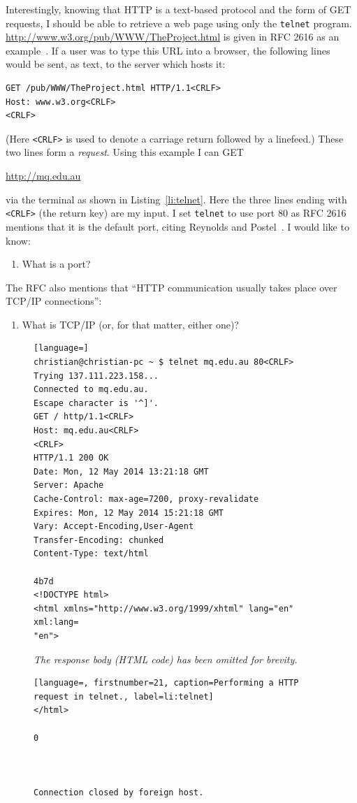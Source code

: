 \documentclass[11pt,a4paper]{report}
\newcommand{\Q}[2]{
	\label{#2}
	\marginpar{\textbf{Q#1.\begin{NoHyper}\ref{#2}\end{NoHyper} }}
}
\newcounter{saveenumi}
\newcommand{\savei}{\setcounter{saveenumi}{\value{enumi}}}
\newcommand{\loadi}{\setcounter{enumi}{\value{saveenumi}}}
\begin{document}
	Interestingly, knowing that HTTP is a text-based protocol and the form of GET requests, I should be able to retrieve a web page using only the \verb|telnet| program. \url{http://www.w3.org/pub/WWW/TheProject.html} is given in RFC 2616 as an example~\cite[Section~5.1.2]{http-rfc}. If a user was to type this URL into a browser, the following lines would be sent, as text, to the server which hosts it:
	\begin{lstlisting}[style=highlightable, frame=none, numbers=none, xleftmargin=0ex, xrightmargin=0ex]
GET /pub/WWW/TheProject.html HTTP/1.1<CRLF>
Host: www.w3.org<CRLF>
<CRLF>
	\end{lstlisting}
	(Here \verb|<CRLF>| is used to denote a carriage return followed by a linefeed.) These two lines form a \textit{request}. Using this example I can GET \begin{NoHyper}\url{http://mq.edu.au}\end{NoHyper} via the terminal as shown in Listing~\ref{li:telnet}.
	Here the three lines ending with \verb|<CRLF>| (the return key) are my input. I set \verb|telnet| to use port 80 as RFC 2616 mentions that it is the default port, citing Reynolds and Postel~\cite{ports}. I would like to know:
	\begin{enumerate}
		\loadi
		\item What is a port? \Q{2}{enum:port}
		\savei
	\end{enumerate}
	The RFC also mentions that ``HTTP communication usually takes place over TCP/IP connections'':
	\begin{enumerate}
		\loadi
		\item What is TCP/IP (or, for that matter, either one)? \Q{2}{enum:tcpip}
		\savei
	\end{enumerate}
	
	\begin{figure}
	\begin{lstlisting}[language=]
christian@christian-pc ~ $ telnet mq.edu.au 80<CRLF>
Trying 137.111.223.158...
Connected to mq.edu.au.
Escape character is '^]'.
GET / http/1.1<CRLF>
Host: mq.edu.au<CRLF>
<CRLF>
HTTP/1.1 200 OK
Date: Mon, 12 May 2014 13:21:18 GMT
Server: Apache
Cache-Control: max-age=7200, proxy-revalidate
Expires: Mon, 12 May 2014 15:21:18 GMT
Vary: Accept-Encoding,User-Agent
Transfer-Encoding: chunked
Content-Type: text/html

4b7d
<!DOCTYPE html>
<html xmlns="http://www.w3.org/1999/xhtml" lang="en" xml:lang=
"en">
	\end{lstlisting}
	\begin{center}
		\textit{The response body (HTML code) has been omitted for brevity.}
	\end{center}
\begin{lstlisting}[language=, firstnumber=21, caption=Performing a HTTP request in telnet., label=li:telnet]
</html>

0



Connection closed by foreign host.
	\end{lstlisting}
	\end{figure}
	
\end{document}
